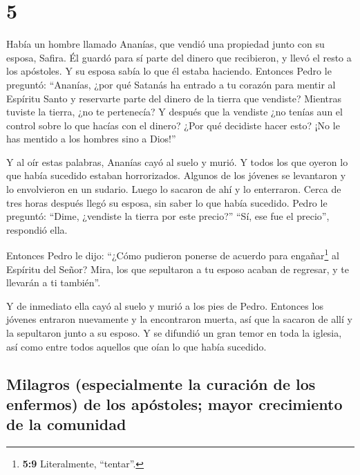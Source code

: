 \hypertarget{section-4}{%
\section{5}\label{section-4}}

 Había un hombre llamado Ananías, que vendió una propiedad
junto con su esposa, Safira.  Él guardó para sí parte del
dinero que recibieron, y llevó el resto a los apóstoles. Y su esposa
sabía lo que él estaba haciendo.  Entonces Pedro le
preguntó: ``Ananías, ¿por qué Satanás ha entrado a tu corazón para
mentir al Espíritu Santo y reservarte parte del dinero de la tierra que
vendiste?  Mientras tuviste la tierra, ¿no te pertenecía?
Y después que la vendiste ¿no tenías aun el control sobre lo que hacías
con el dinero? ¿Por qué decidiste hacer esto? ¡No le has mentido a los
hombres sino a Dios!''

 Y al oír estas palabras, Ananías cayó al suelo y murió. Y
todos los que oyeron lo que había sucedido estaban horrorizados.
 Algunos de los jóvenes se levantaron y lo envolvieron en
un sudario. Luego lo sacaron de ahí y lo enterraron. 
Cerca de tres horas después llegó su esposa, sin saber lo que había
sucedido.  Pedro le preguntó: ``Dime, ¿vendiste la tierra
por este precio?'' ``Sí, ese fue el precio'', respondió ella.

 Entonces Pedro le dijo: ``¿Cómo pudieron ponerse de
acuerdo para engañar\footnote{\textbf{5:9} Literalmente, ``tentar''.} al
Espíritu del Señor? Mira, los que sepultaron a tu esposo acaban de
regresar, y te llevarán a ti también''.

 Y de inmediato ella cayó al suelo y murió a los pies de
Pedro. Entonces los jóvenes entraron nuevamente y la encontraron muerta,
así que la sacaron de allí y la sepultaron junto a su esposo.
 Y se difundió un gran temor en toda la iglesia, así como
entre todos aquellos que oían lo que había sucedido.

\hypertarget{milagros-especialmente-la-curaciuxf3n-de-los-enfermos-de-los-apuxf3stoles-mayor-crecimiento-de-la-comunidad}{%
\subsection{Milagros (especialmente la curación de los enfermos) de los
apóstoles; mayor crecimiento de la
comunidad}\label{milagros-especialmente-la-curaciuxf3n-de-los-enfermos-de-los-apuxf3stoles-mayor-crecimiento-de-la-comunidad}}

